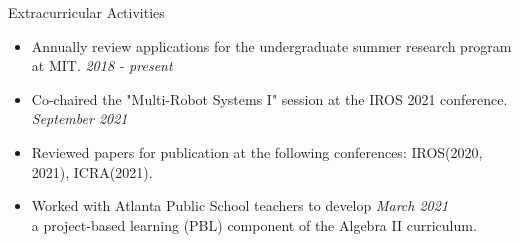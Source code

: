 \documentclass{resume} %
\begin{document}


\begin{rSection}{Extracurricular Activities}
\renewcommand\labelitemi{\raisebox{0.15ex}{$\cdot$}}
\begin{itemize}
\setlength{\itemindent}{-2.2em}

\item Annually review applications for the undergraduate summer research program at MIT.
\hfill {\em2018 - present}

\item Co-chaired the "Multi-Robot Systems I" session at the IROS 2021 conference. \hfill {\em September 2021}

\item Reviewed papers for publication at the following conferences: IROS(2020, 2021), ICRA(2021).

\item Worked with Atlanta Public School teachers to develop  \hfill {\em March 2021}\\ a project-based learning (PBL) component of the Algebra II curriculum.

\end{itemize}

\end{rSection}




\end{document}
